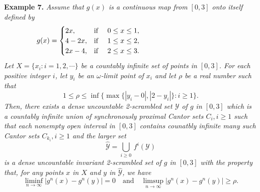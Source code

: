 \documentclass[12pt]{article}
\begin{document}
{\bf Example 7.}
{\it Assume that $g(x)$ is a continuous map from $[0, 3]$ onto itself defined by  
$$
g(x) =  \begin{cases}
               2x, & \text{if \quad $0 \le x \le 1$}, \qquad\qquad\qquad \qquad\qquad\qquad \cr
               4-2x, & \text{if \quad $1 \le x \le 2$}, \qquad\qquad\qquad \qquad\qquad\qquad \cr
               2x-4, & \text{if \quad $2 \le x \le 3$}. \qquad\qquad\qquad \qquad\qquad\qquad \cr
       \end{cases}
$$
Let $X = \{ x_i : i = 1, 2, \cdots \}$ be a countably infinite set of points in $[0, 3]$.  For each positive integer $i$, let $y_i$ be an $\omega$-limit point of $x_i$ and let $\rho$ be a real number such that $$1 \le \rho \le \inf \bigg\{ \max \big\{ |y_i - 0|, |2-y_i| \big\} : i \ge 1 \bigg\}.$$  Then, there exists a dense uncountable 2-scrambled set $\mathcal Y$ of $g$ in $[0, 3]$ which is a countably infinite union of synchronously proximal Cantor sets $C_i, i \ge 1$ such that each nonempty open interval in $[0, 3]$ contains counatbly infinite many such Cantor sets $C_{k_i}, i \ge 1$ and the larger set $$\widehat {\mathcal Y} = \bigcup_{i \ge 0} \, f^i(\mathcal Y)$$is a dense uncountable {\rm invariant} 2-scrambled set of $g$ in $[0, 3]$ with the property that, for any points $x$ in $X$ and $y$ in $\widehat {\mathcal Y}$, we have $$\liminf_{n \to \infty} \big|g^n(x)-g^n(y)\big| = 0 \quad \text{and} \quad \limsup_{n \to \infty} \big|g^n(x)-g^n(y)\big| \ge \rho.$$}
\end{document}
